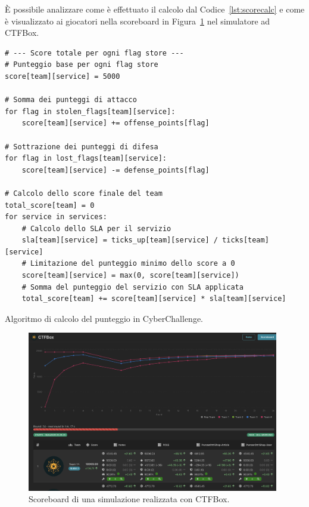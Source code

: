 È possibile analizzare come è effettuato il calcolo dal Codice~\ref{lst:scorecalc} e come è visualizzato ai giocatori nella scoreboard in Figura~\ref{fig:ctfbox_scoreboard} nel simulatore \gls{ad} CTFBox.

\begin{listing}[H]
\begin{verbatim}
# --- Score totale per ogni flag store ---
# Punteggio base per ogni flag store
score[team][service] = 5000

# Somma dei punteggi di attacco
for flag in stolen_flags[team][service]:
    score[team][service] += offense_points[flag]

# Sottrazione dei punteggi di difesa
for flag in lost_flags[team][service]:
    score[team][service] -= defense_points[flag]

# Calcolo dello score finale del team
total_score[team] = 0
for service in services:
    # Calcolo dello SLA per il servizio
    sla[team][service] = ticks_up[team][service] / ticks[team][service]
    # Limitazione del punteggio minimo dello score a 0
    score[team][service] = max(0, score[team][service])
    # Somma del punteggio del servizio con SLA applicata
    total_score[team] += score[team][service] * sla[team][service]
\end{verbatim}
\vspace{-1em}
\caption{Algoritmo di calcolo del punteggio in CyberChallenge.}\label{lst:scorecalc}
\end{listing}

\begin{figure}[H]
    \centering
    \includegraphics[width=0.98\textwidth]{images/chapter1/ctfbox_scoreboard.png}
    \caption{Scoreboard di una simulazione realizzata con CTFBox.}\label{fig:ctfbox_scoreboard}
\end{figure}

